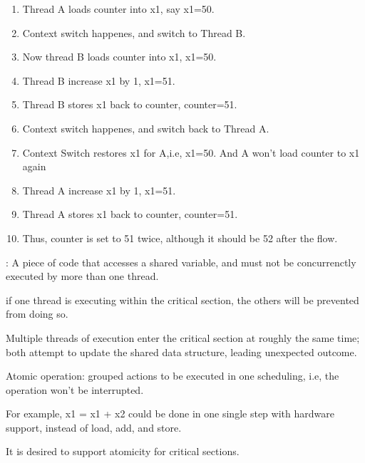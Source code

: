     \begin{enumerate}
        \item Thread A loads counter into x1, say x1=50.
        \item Context switch happenes, and switch to Thread B.
        \item Now thread B loads counter into x1, x1=50.
        \item Thread B increase x1 by 1, x1=51.
        \item Thread B stores x1 back to counter, counter=51.
        \item Context switch happenes, and switch back to Thread A.
        \item Context Switch restores x1 for A,i.e, x1=50. And A won't load counter to x1 again
        \item Thread A increase x1 by 1, x1=51.
        \item Thread A stores x1 back to counter, counter=51.
        \item Thus, counter is set to 51 twice, although it should be 52 after the flow.
    \end{enumerate}


   : A piece of code that accesses a shared variable, and
   must not be concurrenctly executed by more than one thread.
   

     if one thread is executing within the critical section, 
    the others will be prevented from doing so.


    Multiple threads of execution enter the critical section at roughly the same
    time; both attempt to update the shared data structure, 
    leading unexpected outcome.


    Atomic operation: grouped actions to be executed in one scheduling, i.e,
    the operation won't be interrupted.

    For example, x1 = x1 + x2 could be done in one single step with hardware support,
    instead of load, add, and store.

    It is desired to support atomicity for critical sections.   




     
